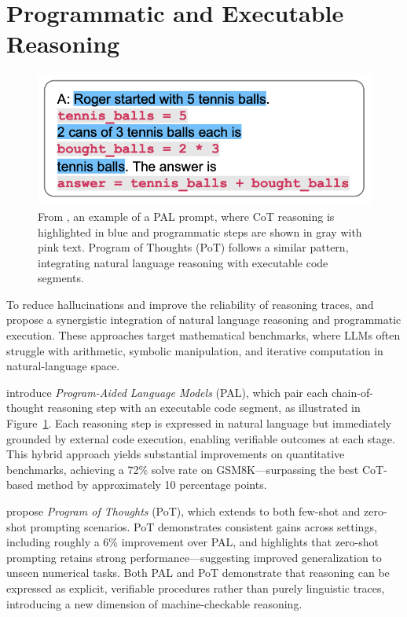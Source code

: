 \documentclass[project]{bsu-cs}  %
\begin{document}
\section{Programmatic and Executable Reasoning}\label{sec:programmatic}
% 
\begin{figure}
    \centering
    \includegraphics[width=0.8\linewidth]{figures/pal1.png}
    \caption{From \citet{gao2023palprogramaidedlanguagemodels}, an example of a PAL prompt, where CoT reasoning is highlighted in blue and programmatic steps are shown in gray with pink text. Program of Thoughts (PoT) follows a similar pattern, integrating natural language reasoning with executable code segments.}
    \label{fig:pal1}
\end{figure}
% 
To reduce hallucinations and improve the reliability of reasoning traces, \citet{gao2023palprogramaidedlanguagemodels} and \citet{chen2023programthoughtspromptingdisentangling} propose a synergistic integration of natural language reasoning and programmatic execution. These approaches target mathematical benchmarks, where LLMs often struggle with arithmetic, symbolic manipulation, and iterative computation in natural-language space. 

\citet{gao2023palprogramaidedlanguagemodels} introduce \textit{Program-Aided Language Models} (PAL), which pair each chain-of-thought reasoning step with an executable code segment, as illustrated in Figure~\ref{fig:pal1}. Each reasoning step is expressed in natural language but immediately grounded by external code execution, enabling verifiable outcomes at each stage. This hybrid approach yields substantial improvements on quantitative benchmarks, achieving a 72\% solve rate on GSM8K—surpassing the best CoT-based method by approximately 10 percentage points.

\citet{chen2023programthoughtspromptingdisentangling} propose \textit{Program of Thoughts} (PoT), which extends to both few-shot and zero-shot prompting scenarios. PoT demonstrates consistent gains across settings, including roughly a 6\% improvement over PAL, and highlights that zero-shot prompting retains strong performance—suggesting improved generalization to unseen numerical tasks. Both PAL and PoT demonstrate that reasoning can be expressed as explicit, verifiable procedures rather than purely linguistic traces, introducing a new dimension of machine-checkable reasoning.
\end{document}
